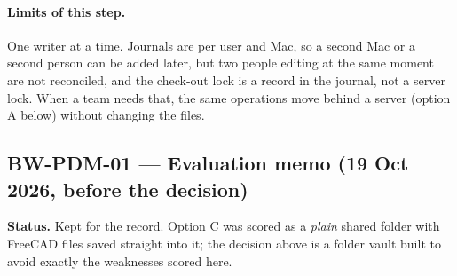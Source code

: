 \paragraph{Limits of this step.} One writer at a time. Journals are per user and Mac, so a second Mac or a second
person can be added later, but two people editing at the same moment are not reconciled, and the check-out lock is a
record in the journal, not a server lock. When a team needs that, the same operations move behind a server
(option A below) without changing the files.

\subsection{BW-PDM-01 --- Evaluation memo (19 Oct 2026, before the decision)}\label{sec:pdm-eval}

\textbf{Status.} Kept for the record. Option C was scored as a \emph{plain} shared folder with FreeCAD files
saved straight into it; the decision above is a folder vault built to avoid exactly the weaknesses scored here.

